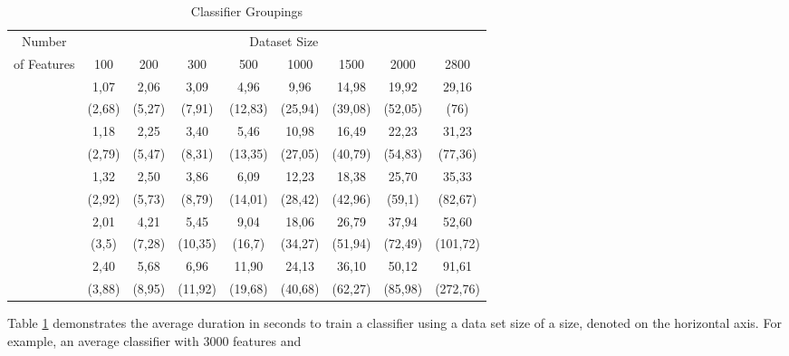 			
			\begin{table}[h]
				\hskip-0.4cm
				\footnotesize	
					\begin{tabular}{c| c c c c c c c c} 
						\hline \hline
						 Number & \multicolumn{8}{c}{Dataset Size} \\
						 \cline{2-9}
						 of Features & 100 &  200 &  300  & 500  & 1000 & 1500 & 2000 & 2800\\ 
						\hline
						\vspace*{-2mm} 
						\multirow{2}{*}{100} & 1,07  & 2,06  & 3,09 	& 4,96  & 9,96  & 14,98 & 19,92 & 29,16  \\
										  	 &(2,68) & (5,27)&(7,91)	&(12,83)&(25,94)&(39,08)&(52,05)&(76)    \\
						\vspace*{-2mm} 
						\multirow{2}{*}{500} & 1,18  & 2,25  & 3,40 	&	5,46& 10,98 & 16,49 & 22,23 & 31,23  \\
						 	      			 & (2,79)& (5,47)&(8,31)	&(13,35)&(27,05)&(40,79)&(54,83)&(77,36) \\
						\vspace*{-2mm} 
						\multirow{2}{*}{1000}& 1,32  & 2,50	 & 3,86 	& 6,09 	& 12,23 & 18,38 & 25,70 & 35,33  \\
							      			 & (2,92)& (5,73)&(8,79)	&(14,01)&(28,42)&(42,96)&(59,1) &(82,67) \\
						\vspace*{-2mm} 
						\multirow{2}{*}{3000}& 2,01	 & 4,21  & 5,45	    & 9,04  & 18,06 & 26,79 & 37,94 & 52,60  \\
							     			 &(3,5)  &(7,28) &(10,35)   &(16,7) &(34,27)&(51,94)&(72,49)&(101,72)\\
						\vspace*{-2mm} 
						\multirow{2}{*}{5000}& 2,40	 & 5,68	 & 6,96	    & 11,90 & 24,13 & 36,10 &50,12	& 91,61   \\
							      			 & (3,88)&(8,95) &(11,92)   &(19,68)&(40,68)&(62,27)&(85,98)&(272,76)\\
						\hline
						\hline
					\end{tabular}
				\caption[Classifier Groupings]{Classifier Groupings}
				\label{table:class_duration}
			\end{table}
		
		Table \ref{table:class_duration} demonstrates the average duration in seconds to train a classifier using a data set size of a size, denoted on the horizontal axis. For example, an average classifier with 3000 features and 
				
